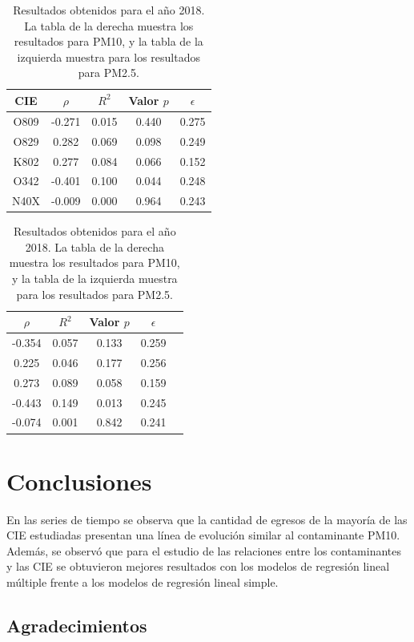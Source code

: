 \documentclass[a0]{sciposter} %
\begin{document}
\begin{multicols}{3}
\begin{table}[hbt!]
\centering
\captionsetup{type=table}
\setcounter{table}{2}
\caption{Resultados obtenidos para el año 2018. La tabla de la derecha muestra los resultados para PM10, y la tabla de la izquierda muestra para los resultados para PM2.5.}
\label{tab:Resultados obtenidos 2018}
\begin{adjustbox}{width=1\textwidth}
\begin{tabular}{|c|c|c|c|c|}
	\hline
	CIE & $\rho$ & $R^2$ & Valor $p$ & $\epsilon$\\
	\hline
	O809 & -0.271 & 0.015 & 0.440 & 0.275 \\
	\hline
	O829 & 0.282 & 0.069 & 0.098 & 0.249 \\
	\hline
	K802 & 0.277 & 0.084 & 0.066 & 0.152 \\
	\hline
	O342 & -0.401 & 0.100 & 0.044 & 0.248 \\
	\hline
	N40X & -0.009 & 0.000 & 0.964 & 0.243 \\
	\hline
\end{tabular}
\hspace{0.5cm}
\begin{tabular}{|c|c|c|c|c|}
	\hline
	$\rho$ & $R^2$ & Valor $p$ & $\epsilon$\\
	\hline
	-0.354 & 0.057 & 0.133 & 0.259 \\
	\hline
	0.225 & 0.046 & 0.177 & 0.256 \\
	\hline
	0.273 & 0.089 & 0.058 & 0.159 \\
	\hline
	-0.443 & 0.149 & 0.013 & 0.245 \\
	\hline
	-0.074 & 0.001 & 0.842 & 0.241 \\
	\hline
\end{tabular}
\end{adjustbox}
\end{table}


\section{Conclusiones}
En las series de tiempo se observa que la cantidad de egresos de la mayoría de las CIE estudiadas presentan
una línea de evolución similar al contaminante PM10.
Además, se observó que para el estudio de las relaciones entre los contaminantes y las CIE se obtuvieron mejores resultados con los modelos de regresión lineal múltiple frente a los modelos de regresión lineal simple.


\subsection*{Agradecimientos}


\end{multicols}
\end{document}
